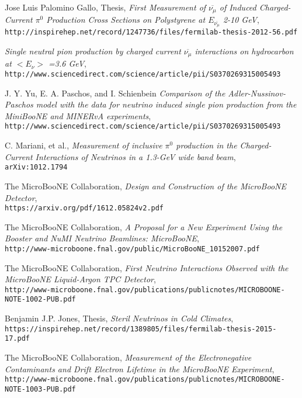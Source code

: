 \documentclass[12pt]{article}
\begin{document}
\begin{thebibliography}{20}
  Jose Luis Palomino Gallo, Thesis, \emph{First Measurement of $\overline{\nu_\mu}$ of Induced Charged-Current $\pi^0$ Production Cross Sections on Polystyrene at $E_{\overline{\nu_\mu}}$ 2-10 GeV},\\
  \texttt{http://inspirehep.net/record/1247736/files/fermilab-thesis-2012-56.pdf}  
  
   \emph{Single neutral pion production by charged current $\overline{\nu_\mu}$ interactions on hydrocarbon at $< E_\nu >$ =3.6 GeV},\\
  \texttt{http://www.sciencedirect.com/science/article/pii/S0370269315005493}  

  J. Y. Yu, E. A. Paschos, and I. Schienbein \emph{Comparison of the Adler-Nussinov-Paschos model with the data for neutrino induced single pion production from the MiniBooNE and MINERvA experiments},\\
  \texttt{http://www.sciencedirect.com/science/article/pii/S0370269315005493}  
  
  C. Mariani, et al., \emph{Measurement of inclusive $\pi^0$ production in the Charged-Current Interactions of Neutrinos in a 1.3-GeV wide band beam},\\
  \texttt{arXiv:1012.1794}

  The MicroBooNE Collaboration, \emph{Design and Construction of the MicroBooNE Detector},\\
  \texttt{https://arxiv.org/pdf/1612.05824v2.pdf}

  The MicroBooNE Collaboration, \emph{A Proposal for a New Experiment Using the Booster and NuMI Neutrino Beamlines: MicroBooNE},\\
  \texttt{http://www-microboone.fnal.gov/public/MicroBooNE\_10152007.pdf}

  The MicroBooNE Collaboration, \emph{First Neutrino Interactions Observed with the MicroBooNE Liquid-Argon TPC Detector},\\
  \texttt{http://www-microboone.fnal.gov/publications/publicnotes/MICROBOONE-NOTE-1002-PUB.pdf}

  Benjamin J.P. Jones, Thesis, \emph{Steril Neutrinos in Cold Climates},\\
  \texttt{https://inspirehep.net/record/1389805/files/fermilab-thesis-2015-17.pdf}

  The MicroBooNE Collaboration, \emph{Measurement of the Electronegative Contaminants and Drift Electron Lifetime in the MicroBooNE Experiment},\\
  \texttt{http://www-microboone.fnal.gov/publications/publicnotes/MICROBOONE-NOTE-1003-PUB.pdf}


\end{thebibliography}
\end{document}

